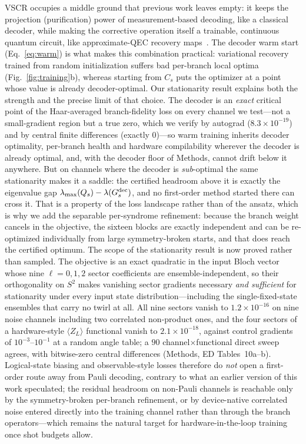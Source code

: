 \documentclass[aps,prxquantum,reprint,superscriptaddress]{revtex4-2}
\begin{document}
VSCR occupies a middle ground that previous work leaves empty: it keeps the
projection (purification) power of measurement-based decoding, like a
classical decoder, while making the corrective operation itself a trainable,
continuous quantum circuit, like approximate-QEC recovery
maps~\cite{petz_map,beny_optimal}. The decoder warm start
(Eq.~\ref{eq:warm}) is what makes this combination practical: variational
recovery trained from random initialization suffers bad per-branch local
optima (Fig.~\ref{fig:training}b), whereas starting from $C_s$ puts the
optimizer at a point whose value is already decoder-optimal. Our stationarity
result explains both the strength and the precise limit of that choice. The
decoder is an \emph{exact} critical point of the Haar-averaged branch-fidelity
loss on every channel we test---not a small-gradient region but a true zero,
which we verify by autograd ($8.3\times10^{-19}$) and by central finite
differences (exactly $0$)---so warm training inherits decoder optimality,
per-branch health and hardware compilability wherever the decoder is already
optimal, and, with the decoder floor of Methods, cannot drift below it
anywhere. But on channels where the decoder is \emph{sub}-optimal the same
stationarity makes it a saddle: the certified headroom above it is exactly the
eigenvalue gap $\lambda_{\max}(Q_s)-\lambda(G^{\rm dec}_s)$, and no first-order
method started there can cross it. That is a property of the loss landscape
rather than of the ansatz, which is why we add the separable per-syndrome
refinement: because the branch weight cancels in the objective, the sixteen
blocks are exactly independent and can be re-optimized individually from large
symmetry-broken starts, and that does reach the certified optimum. The scope of
the stationarity result is now proved rather than sampled. The objective is an
exact quadratic in the input Bloch vector whose nine $\ell=0,1,2$ sector
coefficients are ensemble-independent, so their orthogonality on $S^2$ makes
vanishing sector gradients necessary \emph{and sufficient} for stationarity under
every input state distribution---including the single-fixed-state ensembles that
carry no twirl at all. All nine sectors vanish to $1.2\times10^{-16}$ on nine
noise channels including two correlated non-product ones, and the four sectors of
a hardware-style $\langle Z_L\rangle$ functional vanish to $2.1\times10^{-18}$,
against control gradients of $10^{-3}$--$10^{-1}$ at a random angle table; a $90$
channel$\times$functional direct sweep agrees, with bitwise-zero central
differences (Methods, ED Tables~10a--b). Logical-state biasing and observable-style losses therefore do
\emph{not} open a first-order route away from Pauli decoding, contrary to what an
earlier version of this work speculated; the residual headroom on non-Pauli
channels is reachable only by the symmetry-broken per-branch refinement, or by
device-native correlated noise entered directly into the training channel rather
than through the branch operators---which remains the natural target for
hardware-in-the-loop training once shot budgets allow.
\end{document}
